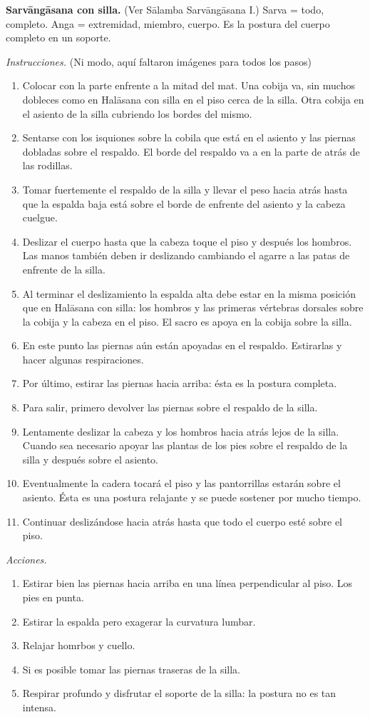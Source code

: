 \medskip\noindent\textbf{Sarvāngāsana con
silla.}
(Ver Sālamba Sarvāngāsana I.) Sarva = todo,
completo. Anga = extremidad, miembro, cuerpo.
Es la postura del cuerpo completo en un
soporte.

\emph{Instrucciones.} (Ni modo, aquí faltaron
imágenes para todos los pasos)
\begin{enumerate}
\item Colocar con la parte enfrente a la
mitad del mat. Una cobija va, sin muchos
dobleces como en Halāsana con silla en el
piso cerca de la silla. Otra cobija en el
asiento de la silla cubriendo los bordes del
mismo.
\item Sentarse con los isquiones sobre la
cobila que está en el asiento y las piernas
dobladas sobre el respaldo. El borde del
respaldo va a en la parte de atrás de las
rodillas.
\item Tomar fuertemente el respaldo de la
silla y llevar el peso hacia atrás hasta que
la espalda baja está sobre el borde de
enfrente del asiento y la cabeza cuelgue.
\item Deslizar el cuerpo hasta que la cabeza
toque el piso y después los hombros. Las
manos también deben ir deslizando cambiando
el agarre a las patas de enfrente de la
silla.
\item Al terminar el deslizamiento la espalda
alta debe estar en la misma posición que en
Halāsana con silla: los hombros y las
primeras vértebras dorsales sobre la cobija y
la cabeza en el piso. El sacro es apoya en la
cobija sobre la silla.
\item En este punto las piernas aún están
apoyadas en el respaldo. Estirarlas y hacer
algunas respiraciones.
\item Por último, estirar las piernas hacia
arriba: ésta es la postura completa.
\item Para salir, primero devolver las
piernas sobre el respaldo de la silla.
\item Lentamente deslizar la cabeza y los
hombros hacia atrás lejos de la silla. Cuando
sea necesario apoyar las plantas de los pies
sobre el respaldo de la silla y después sobre
el asiento.
\item Eventualmente la cadera tocará el piso
y las pantorrillas estarán sobre el asiento.
Ésta es una postura relajante y se puede
sostener por mucho tiempo.
\item Continuar deslizándose hacia atrás
hasta que todo el cuerpo esté sobre el piso.
\end{enumerate}

\emph{Acciones.}
\begin{enumerate}
\item Estirar bien las piernas hacia arriba
en una línea perpendicular al piso. Los pies
en punta.
\item Estirar la espalda pero exagerar la
curvatura lumbar.
\item Relajar homrbos y cuello.
\item Si es posible tomar las piernas
traseras de la silla.
\item Respirar profundo y disfrutar el
soporte de la silla: la postura no es tan
intensa.
\end{enumerate}

